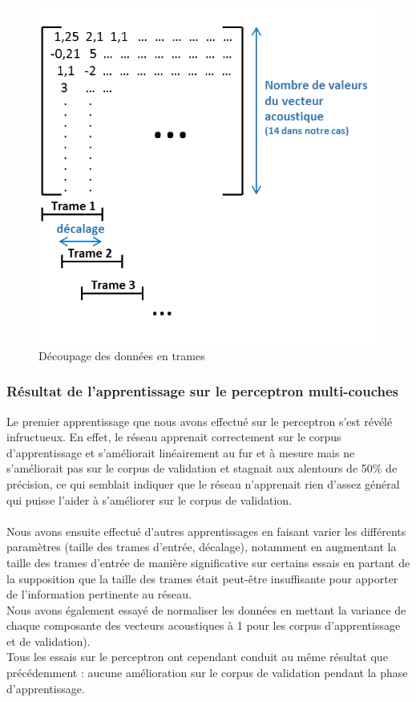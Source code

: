 \documentclass{article}
\begin{document}
\hphantom{.}
\begin{figure}[h]
  \centerline{\includegraphics[scale=0.8]{img/schema_decoupage_trame.png}}
  \caption{Découpage des données en trames}
\end{figure}

\subsubsection{Résultat de l'apprentissage sur le perceptron multi-couches}

Le premier apprentissage que nous avons effectué sur le perceptron s'est révélé infructueux. En effet, le réseau apprenait correctement sur le corpus d'apprentissage et s'améliorait linéairement au fur et à mesure mais ne s'améliorait pas sur le corpus de validation et stagnait aux alentours de 50\% de précision, ce qui semblait indiquer que le réseau n'apprenait rien d'assez général qui puisse l'aider à s'améliorer sur le corpus de validation.\\
 \\
Nous avons ensuite effectué d'autres apprentissages en faisant varier les différents paramètres (taille des trames d'entrée, décalage), notamment en augmentant la taille des trames d'entrée de manière significative sur certains essais en partant de la supposition que la taille des trames était peut-être insuffisante pour apporter de l'information pertinente au réseau.\\
\noindent Nous avons également essayé de normaliser les données en mettant la variance de chaque composante des vecteurs acoustiques à 1 pour les corpus d'apprentissage et de validation).\\
\noindent Tous les essais sur le perceptron ont cependant conduit au même résultat que précédemment : aucune amélioration sur le corpus de validation pendant la phase d'apprentissage.
\end{document}
